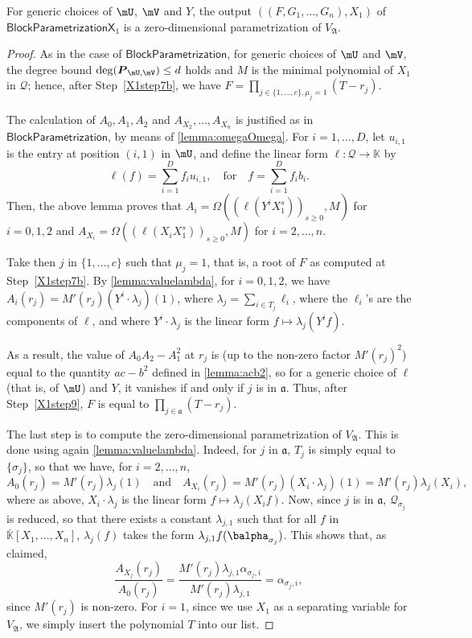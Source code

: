 \documentclass[12pt]{article}
\newcommand{\mat}[1]{\bm{\MakeUppercase{#1}}} %
\newcommand{\mainalgoname}{\mathsf{ BlockParametrization}}
\newcommand{\mf}{Y}
\newcommand{\residueI}{\mathscr{Q}}
\def\K{\mathbb{K}}
\def\K {\ensuremath{\mathbb{K}}}
\def\Kbar {{\ensuremath{\overline{\mathbb{K}}}}}
\begin{document}
\begin{lemma}
  For generic choices of $\mU$, $\mV$ and $\mf$, the output
  $((F,G_1,\dots,G_n),X_1)$ of $\mathsf{BlockParametrizationX}_1$ is a
  zero-dimensional parametrization of $V_{\mathfrak{A}}$.
\end{lemma}
\begin{proof}
  As in the case of $\mainalgoname$, for generic choices of $\mU$ and
  $\mV$, the degree bound $\deg(\mat{P}_{\mU,\mV}) \le d$ holds and
  $M$ is the minimal polynomial of $X_1$ in $\residueI$; hence, after
  Step~\ref{X1step7b}, we have $F=\prod_{j \in \{1,\dots,c\}, \mu_j=1}
  (T-r_j)$. 

  The calculation of $A_0,A_1,A_2$ and $A_{X_2},\dots,A_{X_n}$ is
  justified as in $\mainalgoname$, by means of
  \cref{lemma:omegaOmega}. For $i=1,\dots,D$, let $u_{i,1}$ is the entry at position
  $(i,1)$ in $\mU$, and define the linear 
form $\ell: \residueI \to \K$ by 
  $$\ell(f) = \sum_{i=1}^D f_i u_{i,1}, \quad\text{for}\quad f =
\sum_{i=1}^D f_i b_i.$$ Then, the above lemma proves that $A_i =
\Omega((\ell(\mf^i X_1^s))_{s\ge0},M)$ for $i=0,1,2$ and $A_{X_i} =
\Omega((\ell(X_i X_1^s))_{s\ge0},M)$ for $i=2,\dots,n$.

  Take then $j$ in $\{1,\dots,c\}$ such that $\mu_j=1$, that is, a
  root of $F$ as computed at Step~\ref{X1step7b}. By
  \cref{lemma:valuelambda}, for $i=0,1,2$, we have $ A_i(r_j) = M'(r_j)
  (\mf^i \cdot \lambda_j)(1)$, where $\lambda_j =\sum_{i \in T_j}
  \ell_i$, where the $\ell_i$'s are the components of $\ell$,
  and where $\mf^i \cdot \lambda_j$ is the linear form $f \mapsto \lambda_j(\mf^i f)$.
  
  As a result, the value of $ A_0  A_2 -  A_1^2$ at
  $r_j$ is (up to the non-zero factor $M'(r_j)^2$) equal to the
  quantity $ac-b^2$ defined in \cref{lemma:acb2}, so for a
  generic choice of $\ell$ (that is, of $\mU$) and $\mf$, it vanishes if and only if $j$ is
  in $\mathfrak{a}$. Thus, after Step~\ref{X1step9}, 
  $F$ is equal to $\prod_{j \in \mathfrak{a}} (T-r_j)$.
	
  The last step is to compute the zero-dimensional parametrization of
  $V_{\mathfrak{A}}$. This is done using again
  \cref{lemma:valuelambda}. Indeed, for $j$ in $\mathfrak{a}$, 
  $T_j$ is simply equal to $\{\sigma_j\}$, so that we have, for $i=2,\dots,n$,
  $$ A_0(r_j)=M'(r_j) \lambda_j(1) \quad\text{and}\quad 
  A_{X_i}(r_j) = M'(r_j) (X_i \cdot \lambda_j)(1) = M'(r_j) \lambda_j(X_i),$$
  where as above, $X_i \cdot \lambda_j$ is the linear form $f \mapsto \lambda_j(X_i f)$.
 Now, since $j$
  is in $\mathfrak{a}$, $\residueI_{\sigma_j}$ is reduced, so that there
  exists a constant $\lambda_{j,1}$ such that for all $f$ in
  $\Kbar[X_1,\dots,X_n]$, $\lambda_j(f)$ takes the form $\lambda_{j,1}
  f(\balpha_{\sigma_j})$. This shows that, as claimed,
  $$\frac{ A_{X_j}(r_j)}{ A_0 (r_j)} = 
  \frac
      {M'(r_j) \lambda_{j,1} \alpha_{\sigma_j,i}}{M'(r_j) \lambda_{j,1}} = \alpha_{\sigma_j,i},$$
      since $M'(r_j)$ is non-zero.
      For $i=1$, since we use $X_1$ as a separating variable for $V_{\mathfrak{A}}$, 
      we simply insert the polynomial $T$ into our list.
\end{proof}
\end{document}
